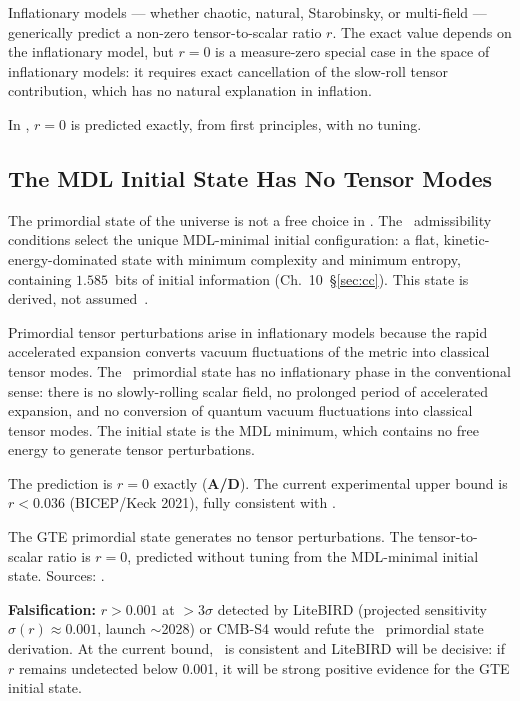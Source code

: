 \documentclass[11pt,openany]{book}
\theoremstyle{remark}
\newcommand{\GTE}{\text{GTE}}
\newcommand{\PSC}{\text{PSC}}
\newcommand{\CatAD}{\textbf{A/D}}
\begin{document}
Inflationary models --- whether chaotic, natural, Starobinsky, or multi-field ---
generically predict a non-zero tensor-to-scalar ratio $r$.  The exact value depends on
the inflationary model, but $r = 0$ is a measure-zero special case in the space of
inflationary models: it requires exact cancellation of the slow-roll tensor contribution,
which has no natural explanation in inflation.

In \GTE, $r = 0$ is predicted exactly, from first principles, with no tuning.

\subsection*{The MDL Initial State Has No Tensor Modes}

The primordial state of the universe is not a free choice in \GTE.  The \PSC\
admissibility conditions select the unique MDL-minimal initial configuration: a flat,
kinetic-energy-dominated state with minimum complexity and minimum entropy, containing
$1.585$~bits of initial information (Ch.~10~\S\ref{sec:cc}).  This state is derived,
not assumed~\cite{SpivackThreeTapeCMCA,SpivackGTEPolynomialUFT}.

Primordial tensor perturbations arise in inflationary models because the rapid
accelerated expansion converts vacuum fluctuations of the metric into classical tensor
modes.  The \GTE\ primordial state has no inflationary phase in the conventional sense:
there is no slowly-rolling scalar field, no prolonged period of accelerated expansion,
and no conversion of quantum vacuum fluctuations into classical tensor modes.  The
initial state is the MDL minimum, which contains no free energy to generate tensor
perturbations.

The prediction is $r = 0$ exactly (\CatAD).  The current experimental upper bound
is $r < 0.036$ (BICEP/Keck 2021), fully consistent with \GTE.

\begin{tcolorbox}[colback=orange!5,colframe=orange!60,
  title={Result: $r = 0$ Exactly (\CatAD)}]
The GTE primordial state generates no tensor perturbations.  The tensor-to-scalar
ratio is $r = 0$, predicted without tuning from the MDL-minimal initial state.
Sources: \cite{SpivackThreeTapeCMCA,SpivackGTEPolynomialUFT}.
\end{tcolorbox}

\textbf{Falsification:}  $r > 0.001$ at $>3\sigma$ detected by LiteBIRD (projected
sensitivity $\sigma(r) \approx 0.001$, launch $\sim$2028) or CMB-S4 would refute
the \GTE\ primordial state derivation.  At the current bound, \GTE\ is consistent and
LiteBIRD will be decisive: if $r$ remains undetected below 0.001, it will be strong
positive evidence for the GTE initial state.
\end{document}
